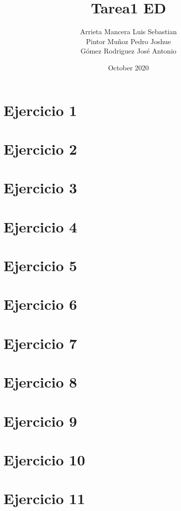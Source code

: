 \documentclass{article}
\title{Tarea1 ED}
\author{Arrieta Mancera Luis Sebastian\\ Pintor Muñoz Pedro Joshue\\ Gómez Rodriguez José Antonio }
\date{October 2020}
\begin{document}
\maketitle

\section{Ejercicio 1}
\section{Ejercicio 2}
\section{Ejercicio 3}
\section{Ejercicio 4}
\section{Ejercicio 5}
\section{Ejercicio 6}
\section{Ejercicio 7}
\section{Ejercicio 8}
\section{Ejercicio 9}
\section{Ejercicio 10}
\section{Ejercicio 11}
\end{document}
